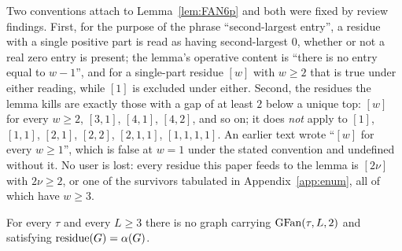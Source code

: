Two conventions attach to Lemma~\ref{lem:FAN6p} and both were fixed by review findings.
First, for the purpose of the phrase ``second-largest entry'', a residue with a single
positive part is read as having second-largest $0$, whether or not a real zero entry is
present; the lemma's operative content is ``there is no entry equal to $w-1$'', and for a
single-part residue $[w]$ with $w \ge 2$ that is true under either reading, while $[1]$ is
excluded under either. Second, the residues the lemma kills are exactly those with a gap of
at least $2$ below a unique top: $[w]$ for every $w \ge 2$, $[3,1]$, $[4,1]$, $[4,2]$, and
so on; it does \emph{not} apply to $[1]$, $[1,1]$, $[2,1]$, $[2,2]$, $[2,1,1]$,
$[1,1,1,1]$. An earlier text wrote ``$[w]$ for every $w \ge 1$'', which is false at
$w = 1$ under the stated convention and undefined without it. No user is lost: every residue
this paper feeds to the lemma is $[2\nu]$ with $2\nu \ge 2$, or one of the survivors
tabulated in Appendix~\ref{app:enum}, all of which have $w \ge 3$.

\begin{theorem}[the $\nu = 2$ layer]\label{thm:GFAN2}
For every $\tau$ and every $L \ge 3$ there is no graph carrying $\mathrm{GFan}(\tau,L,2)$ and
satisfying $\operatorname{residue}(G) = \alpha(G)$.
\end{theorem}

